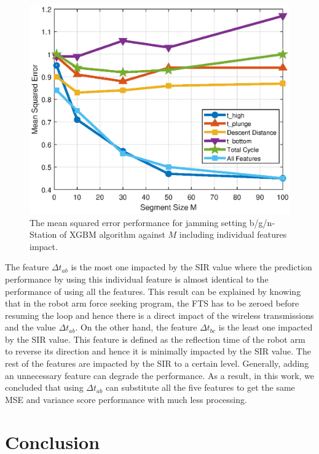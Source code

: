 		\begin{figure}[tbp]
	    \centering
		\includegraphics[width=0.9\columnwidth]{./chapter-ftml/plots/004_MSE_F_3.eps}
		\caption{The mean squared error performance for jamming setting b/g/n-Station of XGBM algorithm against $M$ including individual features impact.}
		\label{fig:004_MSE_F_3}      
	\end{figure}
	
	The feature $\Delta{t}_{ab}$ is the most one impacted by the SIR value where the prediction performance by using this individual feature is almost identical to the performance of using all the features. This result can be explained by knowing that in the robot arm force seeking program, the FTS has to be zeroed before resuming the loop and hence there is a direct impact of the wireless transmissions and the value $\Delta{t}_{ab}$. On the other hand, the feature $\Delta{t}_{bc}$ is the least one impacted by the SIR value. This feature is defined as the reflection time of the robot arm to reverse its direction and hence it is minimally impacted by the SIR value. The rest of the features are impacted by the SIR to a certain level. Generally, adding an unnecessary feature can degrade the performance. As a result, in this work, we concluded that using $\Delta{t}_{ab}$ can substitute all the five features to get the same MSE and variance score performance with much less processing.

	\section{Conclusion}\label{ftml:sec:conclusion}
	
